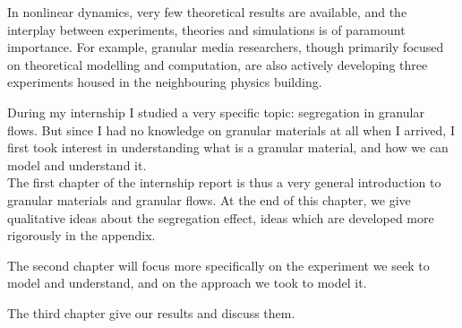 In nonlinear dynamics, very few theoretical results are available, and the interplay between experiments, theories and  simulations is of paramount importance. 
For example, granular media researchers, though primarily focused on theoretical modelling and computation, are also actively developing three experiments housed in the neighbouring physics building.

During my internship I studied a very specific topic: segregation in granular flows. 
But since I had no knowledge on granular materials at all when I arrived, I first took interest in understanding what is a granular material, and how we can model and understand it. \\

The first chapter of the internship report is thus a very general introduction to granular materials and granular flows. At the end of this chapter, we give qualitative ideas about the segregation effect, ideas which are developed more rigorously in the appendix.

The second chapter will focus more specifically on the experiment we seek to model and understand, and on the approach we took to model it.

The third chapter give our results and discuss them.

